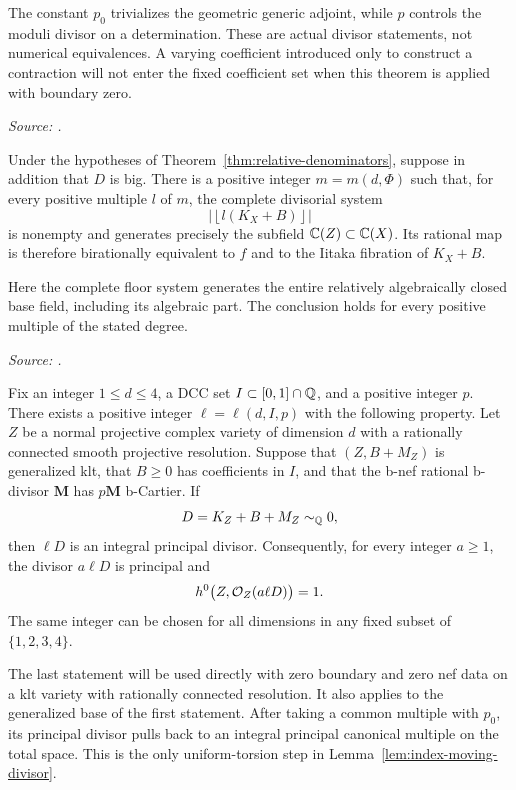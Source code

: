 The constant $p_0$ trivializes the geometric generic adjoint, while
$p$ controls the moduli divisor on a determination. These are actual
divisor statements, not numerical equivalences. A varying coefficient
introduced only to construct a contraction will not enter the fixed
coefficient set when this theorem is applied with boundary zero.

\noindent\textit{Source: \cite[Proposition~\REffectiveNumber]{OpenAIRelative}.}
\begin{proposition}\label{prop:effective-base}
Under the hypotheses of Theorem~\ref{thm:relative-denominators}, suppose in
addition that $D$ is big.  There is a positive integer $m=m(d,\Phi)$ such
that, for every positive multiple $l$ of $m$, the complete divisorial
system
\[
 \left|\left\lfloor l(K_X+B)\right\rfloor\right|
\]
is nonempty and generates precisely the subfield $\mathbb C(Z)\subset\mathbb C(X)$.
Its rational map is therefore birationally equivalent to $f$ and to the
Iitaka fibration of $K_X+B$.
\end{proposition}

Here the complete floor system generates the entire relatively
algebraically closed base field, including its algebraic part. The
conclusion holds for every positive multiple of the stated degree.

\noindent\textit{Source: \cite[Proposition~\RCTorsionNumber]{OpenAIRelative}.}
\begin{proposition}\label{prop:rc-torsion}
Fix an integer $1\leq d\leq 4$, a DCC set
$I\subset [0,1]\cap\mathbb Q$, and a positive integer $p$.
There exists a positive integer $\ell=\ell(d,I,p)$ with the following
property.  Let $Z$ be a normal projective complex variety of dimension $d$
with a rationally connected smooth projective resolution.  Suppose that
$(Z,B+M_Z)$ is generalized klt, that $B\geq 0$ has coefficients in $I$,
and that the b-nef rational b-divisor $\mathbf M$ has $p\mathbf M$
b-Cartier.  If
\[
 D=K_Z+B+M_Z\sim_{\mathbb Q}0,
\]
then $\ell D$ is an integral principal divisor.  Consequently, for every
integer $a\geq1$, the divisor $a\ell D$ is principal and
\[
 h^0\bigl(Z,\mathcal O_Z(a\ell D)\bigr)=1.
\]
The same integer can be chosen for all dimensions in any fixed subset of
$\{1,2,3,4\}$.
\end{proposition}

The last statement will be used directly with zero boundary and zero
nef data on a klt variety with rationally connected resolution. It also
applies to the generalized base of the first statement. After taking a
common multiple with $p_0$, its principal divisor pulls back to an integral
principal canonical multiple on the total space. This is the only
uniform-torsion step in Lemma~\ref{lem:index-moving-divisor}.
